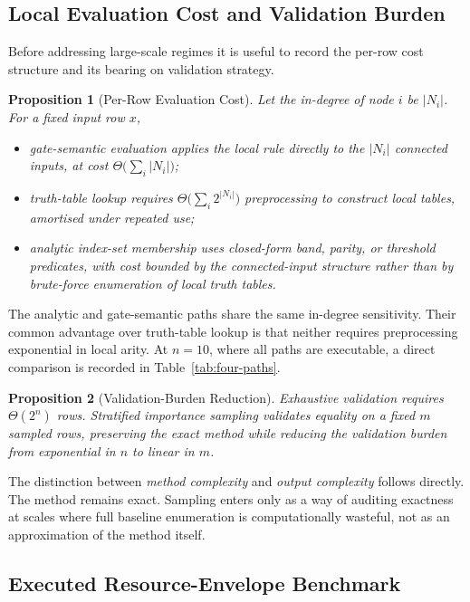 \documentclass[11pt]{article}
\newtheorem{proposition}{Proposition}
\theoremstyle{definition}
\begin{document}
\subsection{Local Evaluation Cost and Validation Burden}

Before addressing large-scale regimes it is useful to record the per-row cost structure and its
bearing on validation strategy.

\begin{proposition}[Per-Row Evaluation Cost]\label{prop:per-row-cost}
Let the in-degree of node \(i\) be \(|N_i|\). For a fixed input row \(x\),
\begin{itemize}
\item gate-semantic evaluation applies the local rule directly to the \(|N_i|\) connected inputs,
  at cost \(\Theta\!\bigl(\sum_i|N_i|\bigr)\);
\item truth-table lookup requires \(\Theta\!\bigl(\sum_i 2^{|N_i|}\bigr)\) preprocessing to
  construct local tables, amortised under repeated use;
\item analytic index-set membership uses closed-form band, parity, or threshold predicates, with
  cost bounded by the connected-input structure rather than by brute-force enumeration of local
  truth tables.
\end{itemize}
\end{proposition}

The analytic and gate-semantic paths share the same in-degree sensitivity. Their common advantage
over truth-table lookup is that neither requires preprocessing exponential in local arity. At
\(n=10\), where all paths are executable, a direct comparison is recorded in
Table~\ref{tab:four-paths}.

\begin{proposition}[Validation-Burden Reduction]\label{prop:validation-burden}
Exhaustive validation requires \(\Theta(2^n)\) rows. Stratified importance sampling validates
equality on a fixed \(m\) sampled rows, preserving the exact method while reducing the validation
burden from exponential in \(n\) to linear in \(m\).
\end{proposition}

The distinction between \emph{method complexity} and \emph{output complexity} follows directly.
The method remains exact. Sampling enters only as a way of auditing exactness at scales where full
baseline enumeration is computationally wasteful, not as an approximation of the method itself.

\subsection{Executed Resource-Envelope Benchmark}
\end{document}
